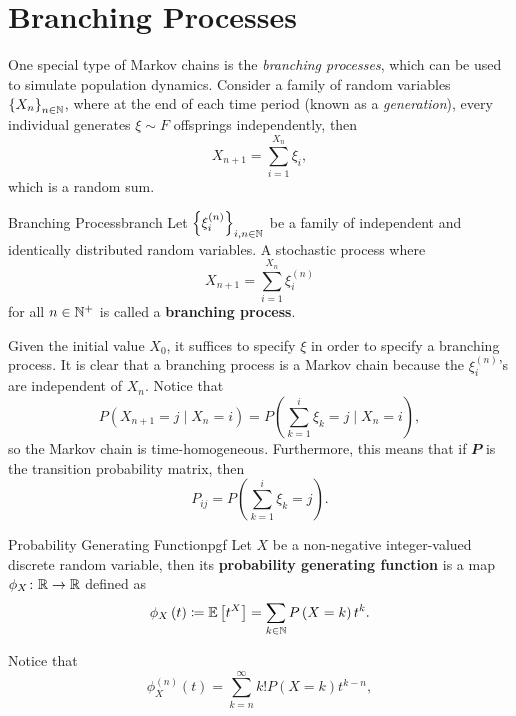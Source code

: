\documentclass[math, code]{amznotes}
\theoremstyle{remark}
\begin{document}
\section{Branching Processes}
One special type of Markov chains is the \textit{branching processes}, which can be used to simulate population dynamics. Consider a family of random variables $\left\{X_n\right\}_{n \in \mathbb{N}}$, where at the end of each time period (known as a \textit{generation}), every individual generates $\xi \sim F$ offsprings independently, then 
\begin{equation*}
    X_{n + 1} = \sum_{i = 1}^{X_n}\xi_i,
\end{equation*}
which is a random sum.
\begin{dfnbox}{Branching Process}{branch}
    Let $\left\{\xi_i^{(n)}\right\}_{i, n \in \mathbb{N}}$ be a family of independent and identically distributed random variables. A stochastic process where 
    \begin{equation*}
        X_{n + 1} = \sum_{i = 1}^{X_n}\xi_i^{(n)}
    \end{equation*}
    for all $n \in \mathbb{N}^+$ is called a {\color{red} \textbf{branching process}}.
\end{dfnbox}
Given the initial value $X_0$, it suffices to specify $\xi$ in order to specify a branching process. It is clear that a branching process is a Markov chain because the $\xi_i^{(n)}$'s are independent of $X_n$. Notice that 
\begin{equation*}
    P\left(X_{n + 1} = j \mid X_n = i\right) = P\left(\sum_{k = 1}^{i}\xi_k = j\mid X_n = i\right),
\end{equation*}
so the Markov chain is time-homogeneous. Furthermore, this means that if $\mathbfit{P}$ is the transition probability matrix, then 
\begin{equation*}
    P_{ij} = P\left(\sum_{k = 1}^{i}\xi_k = j\right).
\end{equation*}
\begin{dfnbox}{Probability Generating Function}{pgf}
    Let $X$ be a non-negative integer-valued discrete random variable, then its {\color{red} \textbf{probability generating function}} is a map $\phi_X \colon \mathbb{R} \to \mathbb{R}$ defined as 
    \begin{equation*}
        \phi_X\left(t\right) \coloneqq \mathbb{E}\left[t^X\right] = \sum_{k \in \mathbb{N}}P\left(X = k\right)t^k.
    \end{equation*}
\end{dfnbox}
Notice that
\begin{equation*}
    \phi_X^{(n)}\left(t\right) = \sum_{k = n}^{\infty}k!P\left(X = k\right)t^{k - n},
\end{equation*}
\end{document}
